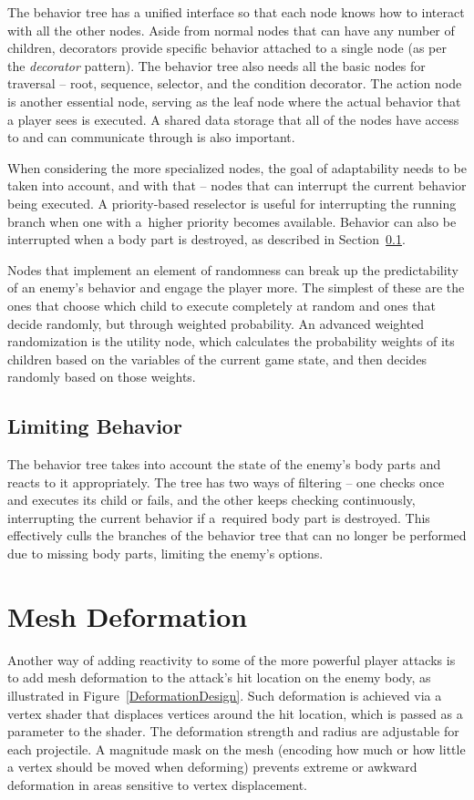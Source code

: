 The behavior tree has a unified interface so that each node knows how to interact with all the other nodes. Aside from normal nodes that can have any number of children, decorators provide specific behavior attached to a single node (as per the \emph{decorator} pattern). The behavior tree also needs all the basic nodes for traversal -- root, sequence, selector, and the condition decorator. The action node is another essential node, serving as the leaf node where the actual behavior that a player sees is executed.
A shared data storage that all of the nodes have access to and can communicate through is also important.

When considering the more specialized nodes, the goal of adaptability needs to be taken into account, and with that -- nodes that can interrupt the current behavior being executed. A priority-based reselector is useful for interrupting the running branch when one with a~higher priority becomes available. Behavior can also be interrupted when a body part is destroyed, as described in Section~\ref{BTBehaviorLimiting}.

Nodes that implement an element of randomness can break up the predictability of an enemy's behavior and engage the player more. The simplest of these are the ones that choose which child to execute completely at random and ones that decide randomly, but through weighted probability. An advanced weighted randomization is the utility node, which calculates the probability weights of its children based on the variables of the current game state, and then decides randomly based on those weights.


\subsection{Limiting Behavior}
\label{BTBehaviorLimiting}
The behavior tree takes into account the state of the enemy's body parts and reacts to it appropriately. The tree has two ways of filtering -- one checks once and executes its child or fails, and the other keeps checking continuously, interrupting the current behavior if a~required body part is destroyed. This effectively culls the branches of the behavior tree that can no longer be performed due to missing body parts, limiting the enemy's options.



\section{Mesh Deformation}
Another way of adding reactivity to some of the more powerful player attacks is to add mesh deformation to the attack's hit location on the enemy body, as illustrated in Figure~\ref{DeformationDesign}. Such deformation is achieved via a vertex shader that displaces vertices around the hit location, which is passed as a parameter to the shader. The deformation strength and radius are adjustable for each projectile. A magnitude mask on the mesh (encoding how much or how little a vertex should be moved when deforming) prevents extreme or awkward deformation in areas sensitive to vertex displacement.


